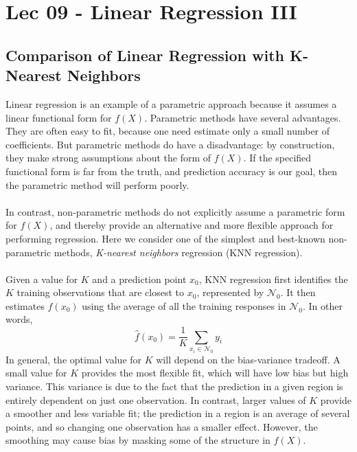 \chapter{Lec 09 - Linear Regression III}

\section{Comparison of Linear Regression with K-Nearest Neighbors}
Linear regression is an example of a parametric approach because it assumes a linear functional form for $f(X)$.  Parametric methods have several advantages. They are often easy to fit, because one need estimate only a small number of coefficients.  But parametric methods do have a disadvantage: by construction, they make strong assumptions about the form of $f(X)$. If the specified functional form is far from the truth, and prediction accuracy is our goal, then the parametric method will perform poorly.\\\\
In contrast, non-parametric methods do not explicitly assume a parametric form for $f(X)$, and thereby provide an alternative and more flexible approach for performing regression. Here we consider one of the simplest and best-known
non-parametric methods, \textit{K-nearest neighbors} regression (KNN regression).\\\\
Given a value for $K$ and a prediction point $x_0$, KNN regression first identifies the $K$ training observations that are closest to $x_0$, represented by $\mathcal{N}_0$. It then estimates $f(x_0)$ using the average of all the training responses in $\mathcal{N}_0$. In other words,
\[\hat{f}(x_0) = \frac{1}{K}\sum_{x_i \in \mathcal{N}_0} y_i\]
In general, the optimal value for $K$ will depend on the bias-variance tradeoff. A small value for $K$ provides the most flexible fit, which will
have low bias but high variance. This variance is due to the fact that the
prediction in a given region is entirely dependent on just one observation.
In contrast, larger values of $K$ provide a smoother and less variable fit; the
prediction in a region is an average of several points, and so changing one observation has a smaller effect. However, the smoothing may cause bias by masking some of the structure in $f(X)$.
